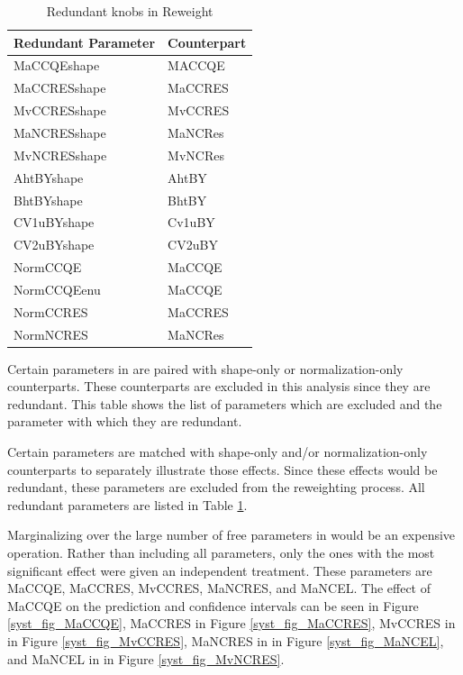 {\begin{table}
\begin{center}
\begin{tabular}{|l|l|}
\hline
\textbf{Redundant Parameter} & \textbf{Counterpart} \\ \hline
MaCCQEshape &  MACCQE \\ \hline
MaCCRESshape &  MaCCRES \\ \hline
MvCCRESshape &  MvCCRES \\ \hline
MaNCRESshape &  MaNCRes  \\ \hline
MvNCRESshape &  MvNCRes \\ \hline
AhtBYshape &  AhtBY \\ \hline
BhtBYshape &  BhtBY \\ \hline
CV1uBYshape &  Cv1uBY\\ \hline
CV2uBYshape &  CV2uBY \\ \hline
NormCCQE &  MaCCQE\\ \hline
NormCCQEenu &  MaCCQE\\ \hline
NormCCRES &  MaCCRES \\ \hline
NormNCRES &  MaNCRes\\ \hline
\end{tabular}
\end{center}
\caption{Redundant knobs in \genie Reweight}{
Certain parameters in \genie are paired with shape-only or normalization-only
counterparts.
These counterparts are excluded in this analysis since they are redundant.
This table shows the list of parameters which are excluded and the parameter
with which they are redundant.
}
\label{redundant_genie_knobs}
\end{table}

Certain parameters are matched with shape-only
and/or normalization-only counterparts to separately illustrate
those effects.
Since these effects would be redundant, these parameters
are excluded from the reweighting process.
All redundant parameters are listed in Table
\ref{redundant_genie_knobs}.


Marginalizing over the large number of free parameters in \genie
would be an expensive operation.
Rather than including all parameters, only the ones
with the most significant effect were given an independent treatment.
These parameters are MaCCQE, MaCCRES, MvCCRES, MaNCRES, and MaNCEL.
The effect of MaCCQE on the prediction and confidence intervals
can be seen in Figure \ref{syst_fig_MaCCQE},
MaCCRES in Figure \ref{syst_fig_MaCCRES},
MvCCRES in in Figure \ref{syst_fig_MvCCRES},
MaNCRES in in Figure \ref{syst_fig_MaNCEL},
and MaNCEL in in Figure \ref{syst_fig_MvNCRES}.

}
